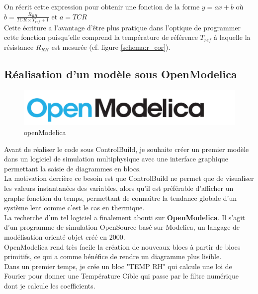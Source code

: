 \documentclass[a4paper]{report}
\begin{document}
	On récrit cette expression pour obtenir une fonction de la forme $y = ax + b$ où $b = \frac{R_{RH}}{TCR \times T_{ref} + 1} $ et $a = TCR $ \\
	
	Cette écriture a l'avantage d'être plus pratique dans l'optique de programmer cette fonction puisqu'elle comprend la température de référence $T_{ref}$ à laquelle la résistance $R_{RH}$ est mesurée (cf. figure \ref{schema:r_cor}).
	
	
	
			
	
	\subsection{Réalisation d'un modèle sous OpenModelica}
	\begin{figure}
		\includegraphics[width=0.9\linewidth]{logo_openmodelica} 
		\caption{openModelica}
		\label{fig:logo_om}
	\end{figure}
	Avant de réaliser le code sous ControlBuild, je souhaite créer un premier modèle dans un logiciel de simulation multiphysique avec une interface graphique permettant la saisie de diagrammes en blocs.\\
	La motivation derrière ce besoin est que ControlBuild ne permet que de visualiser les valeurs instantanées des variables, alors qu'il est préférable d'afficher un graphe fonction du temps, permettant de connaître la tendance globale d'un système lent comme c'est le cas en thermique.\\
	
	La recherche d'un tel logiciel a finalement abouti sur \textbf{OpenModelica}. Il s'agit d'un programme de simulation OpenSource basé sur Modelica, un langage de modélisation orienté objet créé en 2000.\\
	
	OpenModelica rend très facile la création de nouveaux blocs à partir de blocs primitifs, ce qui a comme bénéfice de rendre un diagramme plus lisible.\\
	
	Dans un premier temps, je crée un bloc "TEMP RH" qui calcule une loi de Fourier pour donner une Température Cible qui passe par le filtre numérique dont je calcule les coefficients.\\
		
\end{document}

